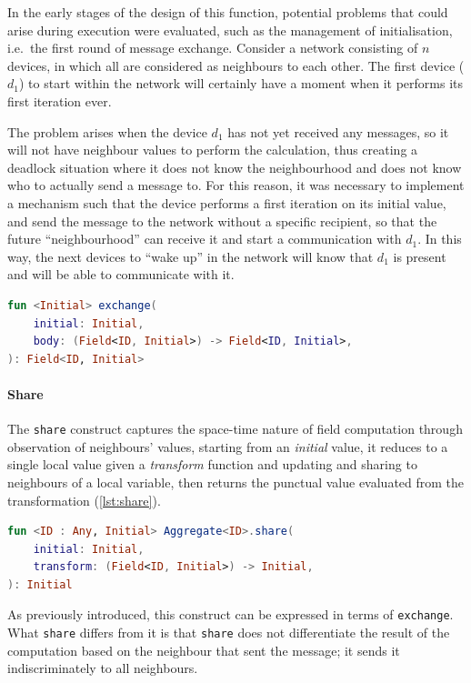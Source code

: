 In the early stages of the design of this function, potential problems that could arise during execution were evaluated,
such as the management of initialisation, i.e.\ the first round of message exchange.
Consider a network consisting of $n$ devices, in which all are considered as neighbours to each other.
The first device ($d_1$) to start within the network will certainly have a moment when it performs its first iteration ever.

The problem arises when the device $d_1$ has not yet received any messages, so it will not have neighbour values to perform
the calculation, thus creating a deadlock situation where it does not know the neighbourhood and does not know who to actually send a message to.
For this reason, it was necessary to implement a mechanism such that the device performs a first iteration on its initial value,
and send the message to the network without a specific recipient, so that the future ``neighbourhood'' can receive it and start a communication with $d_1$.
In this way, the next devices to ``wake up'' in the network will know that $d_1$ is present and will be able to communicate with it.

\begin{lstlisting}[language=kt,label={lst:exchange}, caption={The signature of the \texttt{exchange} function.}]
fun <Initial> exchange(
    initial: Initial,
    body: (Field<ID, Initial>) -> Field<ID, Initial>,
): Field<ID, Initial>
\end{lstlisting}

\paragraph{Share}
The \texttt{share} construct captures the space-time nature of field computation through observation of neighbours' values,
starting from an \emph{initial} value, it reduces to a single local value given a \emph{transform} function and updating and sharing to
neighbours of a local variable, then returns the punctual value evaluated from the transformation (\ref{lst:share}).

\begin{lstlisting}[language=kt,label={lst:share}, caption={The signature of the \texttt{share} function.}]
fun <ID : Any, Initial> Aggregate<ID>.share(
    initial: Initial,
    transform: (Field<ID, Initial>) -> Initial,
): Initial
\end{lstlisting}

As previously introduced, this construct can be expressed in terms of \texttt{exchange}.
What \texttt{share} differs from it is that \texttt{share} does not differentiate the result of the computation based on
the neighbour that sent the message; it sends it indiscriminately to all neighbours.

